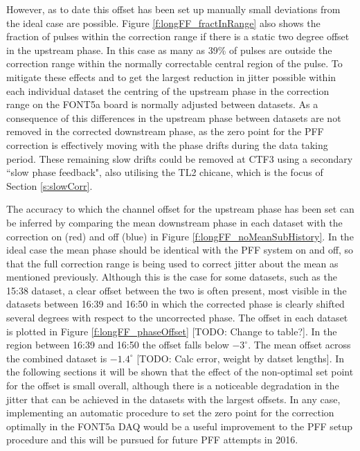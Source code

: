 However, as to date this offset has been set up manually small deviations from the ideal 
case are possible. Figure \ref{f:longFF_fractInRange} also shows the fraction of pulses 
within the correction range if there is a static two degree offset in the upstream 
phase. In this case as many as 39\% of pulses are outside the correction range within 
the normally correctable central region of the pulse. To mitigate these effects and to 
get the largest reduction in jitter possible within each individual dataset the centring of the upstream phase in the correction range on the FONT5a board is normally adjusted 
between datasets. As a consequence of this differences in the upstream phase between 
datasets are not removed in the corrected downstream phase, as the zero point for the 
PFF correction is effectively moving with the phase drifts during the data taking 
period. These remaining slow drifts could be removed at CTF3 using a secondary ``slow 
phase feedback", also utilising the TL2 chicane, which is the focus of Section 
\ref{s:slowCorr}.


The accuracy to which the channel offset for the upstream phase has been set can be 
inferred by comparing the mean downstream phase in each dataset with the correction on 
(red) and off (blue) in Figure \ref{f:longFF_noMeanSubHistory}. In the ideal case the 
mean phase should be identical with the PFF system on and off, so that the full 
correction range is being used to correct jitter about the mean as mentioned previously. 
Although this is the case for some datasets, such as the 15:38 dataset, a clear offset 
between the two is often present, most visible in the datasets between 16:39 and 16:50 
in which the corrected phase is clearly shifted several degrees with respect to the 
uncorrected phase. The offset in each dataset is plotted in Figure 
\ref{f:longFF_phaseOffset} [TODO: Change to table?]. In the region between 16:39 and 
16:50 the offset falls below \(-3^\circ\). The mean offset across the combined dataset 
is \(-1.4^\circ\) [TODO: Calc error, weight by datset lengths]. In the following 
sections it will be shown that the effect of the non-optimal set point for the offset is small overall, although there is a noticeable degradation in the jitter that can be 
achieved in the datasets with the largest offsets. In any case, implementing an 
automatic procedure to set the zero point for the correction optimally in the FONT5a DAQ would be a useful improvement to the PFF setup procedure and this will be pursued for 
future PFF attempts in 2016.


